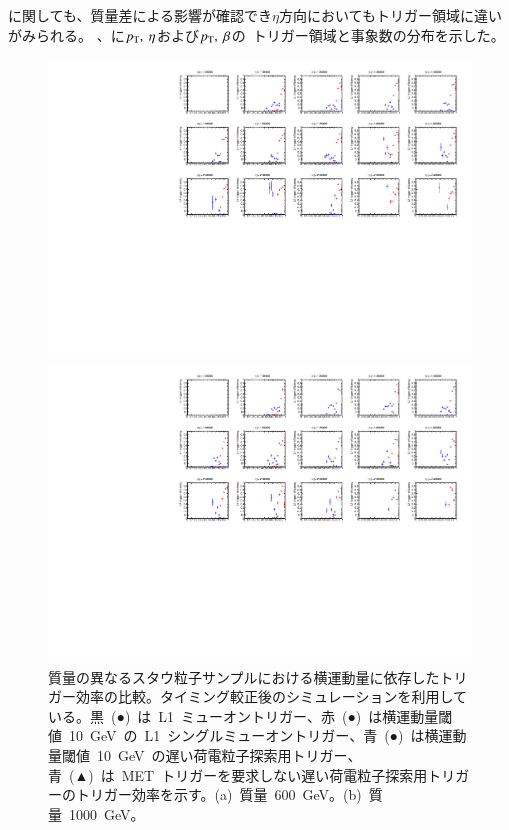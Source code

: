 に関しても、質量差による影響が確認でき$\eta$方向においてもトリガー領域に違いがみられる。
、に$p_{\rm{T}},~\eta$および$p_{\rm{T}},~\beta$の~トリガー領域と事象数の分布を示した。
\begin{figure}[tbp]
    \begin{minipage}{0.49\hsize}
    \centering   
    \includegraphics[width=\textwidth,page=4]{img/rec/stau_600.pdf}
    \subcaption{}
    \end{minipage}
    \begin{minipage}{0.49\hsize}
    \centering   
    \includegraphics[width=\textwidth,page=4]{img/rec/stau_1000.pdf}
    \subcaption{}
    \end{minipage}
    \caption[質量の異なるスタウ粒子サンプルにおける横運動量に依存したトリガー効率の比較]{質量の異なるスタウ粒子サンプルにおける横運動量に依存したトリガー効率の比較。タイミング較正後のシミュレーションを利用している。黒~(●)~は~L1~ミューオントリガー、赤~(●)~は横運動量閾値~10~GeV~の~L1~シングルミューオントリガー、青~(●)~は横運動量閾値~10~GeV~の遅い荷電粒子探索用トリガー、青~(▲)~は~MET~トリガーを要求しない遅い荷電粒子探索用トリガーのトリガー効率を示す。(a)~質量~600~GeV。(b)~質量~1000~GeV。}\label{fig:tript6}
\end{figure}
